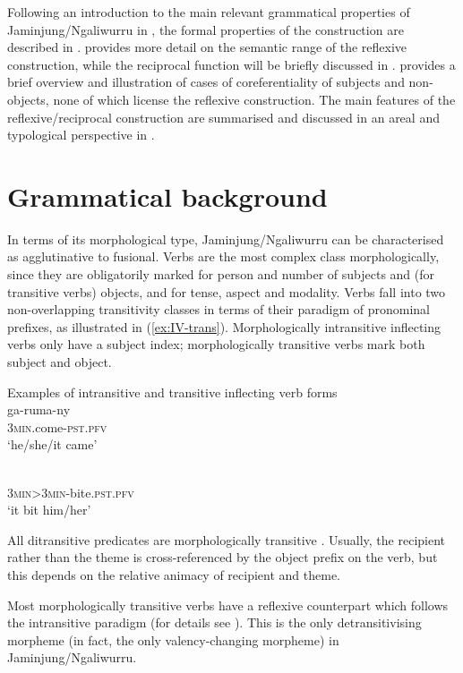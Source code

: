 \documentclass[output=paper,colorlinks,citecolor=brown]{langscibook}
\begin{document}
Following an introduction to the main relevant grammatical properties of Jaminjung/Ngaliwurru in , the formal properties of the construction are described in .  provides more detail on the semantic range of the reflexive construction, while the reciprocal function will be briefly discussed in .  provides a brief overview and illustration of cases of coreferentiality of subjects and non-objects, none of which license the reflexive construction.
The main features of the reflexive/reciprocal construction are summarised and discussed in an areal and typological perspective in .

\section{Grammatical background} \label{sec:SchultzeBernd:2}
In terms of its morphological type, Jaminjung/Ngaliwurru can be characterised as agglutinative to fusional. Verbs are the most complex class morphologically, since they are obligatorily marked for person and number of subjects and (for transitive verbs) objects, and for tense, aspect and modality. Verbs fall into two non-overlapping transitivity classes in terms of their paradigm of pronominal prefixes, as illustrated in (\ref{ex:IV-trans}). Morphologically intransitive inflecting verbs only have a subject index; morphologically transitive verbs mark both subject and object. 

\ea Examples of intransitive and transitive inflecting verb forms\\
\label{ex:IV-trans}
\ea
\gll ga-ruma-ny\\
\textsc{3min}.come-\textsc{pst.pfv}\\ 
\glt `he/she/it came'

\ex
{}\\
\textsc{3min>3min}-bite.\textsc{pst.pfv}\\ 
\glt `it bit him/her'
\z
\z

All ditransitive predicates are morphologically transitive \citep{SchultzeBerndt2010}. Usually, the recipient rather than the theme is cross-referenced by the object prefix on the verb, but this depends on the relative animacy of recipient and theme.

Most morphologically transitive verbs have a reflexive counterpart which follows the intransitive paradigm (for details see ). This is the only detransitivising morpheme (in fact, the only valency-changing morpheme) in Jaminjung/Ngaliwurru.
\end{document}
